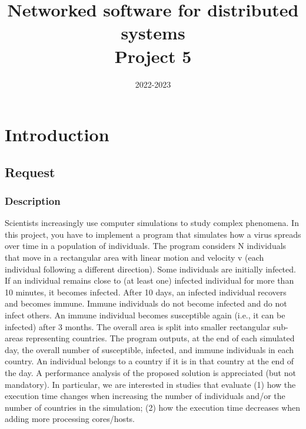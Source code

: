 \documentclass[11pt]{article}
\title{Networked software for distributed systems\\Project 5}
\date{2022-2023}
\begin{document}


\tableofcontents
\cleardoublepage

\section{Introduction}
\subsection{Request}
\subsubsection{Description}
Scientists increasingly use computer simulations to study complex phenomena. In this project, you have to implement a program that simulates how a virus spreads over time in a population of individuals. The program considers N individuals that move in a rectangular area with linear motion and velocity v (each individual following a different direction). Some individuals are initially infected. If an individual remains close to (at least one) infected individual for more than 10 minutes, it becomes infected. After 10 days, an infected individual recovers and becomes immune. Immune individuals do not become infected and do not infect others. An immune individual becomes susceptible again (i.e., it can be infected) after 3 months.
The overall area is split into smaller rectangular sub-areas representing countries. The program outputs, at the end of each simulated day, the overall number of susceptible, infected, and immune individuals in each country. An individual belongs to a country if it is in that country at the end of the day.
A performance analysis of the proposed solution is appreciated (but not mandatory). In particular, we are interested in studies that evaluate (1) how the execution time changes when increasing the number of individuals and/or the number of countries in the simulation; (2) how the execution time decreases when adding more processing cores/hosts. 
\end{document}
